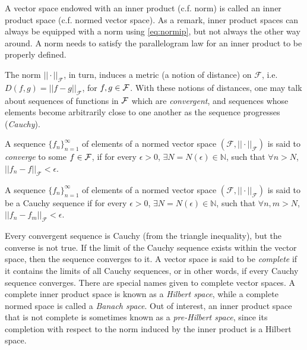 A vector space endowed with an inner product (c.f. norm) is called an inner product space (c.f. normed vector space).
As a remark, inner product spaces can always be equipped with a norm using \cref{eq:normip}, but not always the other way around.
A norm needs to satisfy the parallelogram law for an inner product to be properly defined.

The norm $||\cdot||_{\mathcal F}$, in turn, induces a metric (a notion of distance) on $\mathcal F$, i.e. $D(f,g) = ||f-g||_{\mathcal F}$, for $f,g\in{\mathcal F}$.
With these notions of distances, one may talk about sequences of functions in ${\mathcal F}$ which are \emph{convergent}, and sequences whose elements become arbitrarily close to one another as the sequence progresses (\emph{Cauchy}).

\begin{definition}
	A sequence $\{f_n\}_{n=1}^\infty$ of elements of a normed vector space $(\mathcal F, ||\cdot ||_{\mathcal F})$ is said to \emph{converge} to some $f\in{\mathcal F}$, if for every $\epsilon > 0$, $\exists N=N(\epsilon) \in \mathbb N$, such that $\forall n > N$, $||f_n - f||_{\mathcal F} < \epsilon$.
\end{definition}

\begin{definition}
	A sequence $\{f_n\}_{n=1}^\infty$ of elements of a normed vector space $(\mathcal F, ||\cdot ||_{\mathcal F})$ is said to be a Cauchy sequence if for every $\epsilon > 0$, $\exists N=N(\epsilon) \in \mathbb N$, such that $\forall n,m > N$, $||f_n - f_m||_{\mathcal F} < \epsilon$.
\end{definition}

Every convergent sequence is Cauchy (from the triangle inequality), but the converse is not true.
If the limit of the Cauchy sequence exists within the vector space, then the sequence converges to it.
A vector space is said to be \emph{complete} if it contains the limits of all Cauchy sequences, or in other words, if every Cauchy sequence converges.
There are special names given to complete vector spaces.
A complete inner product space is known as a \emph{Hilbert space}, while a complete normed space is called a \emph{Banach space}.
Out of interest, an inner product space that is not complete is sometimes known as a \emph{pre-Hilbert space}, since its completion with respect to the norm induced by the inner product is a Hilbert space.

